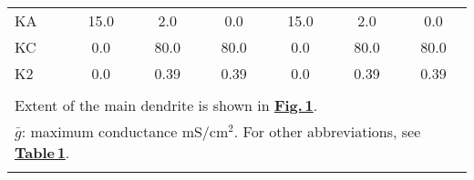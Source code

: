 \documentclass[12pt]{article}
\begin{document}
\begin{table}[!h]
\begin{tabular}{ l c c c c c c }
KA              &15.0             & 2.0                                     & 0.0                              & 15.0             & 2.0                      & 0.0                                                  \\
KC              & 0.0              & 80.0                                   & 80.0                            & 0.0               & 80.0                    & 80.0                                                \\
K2              & 0.0              & 0.39                                    & 0.39                            & 0.0               & 0.39                   & 0.39                                                \\
                   &                     &                                            &                                      &                     &                             &                                                         \\
\multicolumn{7}{l}{Extent of the main dendrite is shown in \href{../pub-purkinje-deschutter1-fig-1/pub-purkinje-deschutter1-fig-1.tex}{\bf Fig.\,1}.}                                                                                                                                 \\
\multicolumn{7}{l}{$\bar g$: maximum conductance mS/cm$^2$. For other abbreviations, see \href{../pub-purkinje-deschutter1-table1/pub-purkinje-deschutter1-table1.tex}{\bf Table\,1}.}                                                \\
\multicolumn{7}{l}{}                                                                                                                                                                                                                   \\
\end{tabular}
\end{table}



\end{document}
